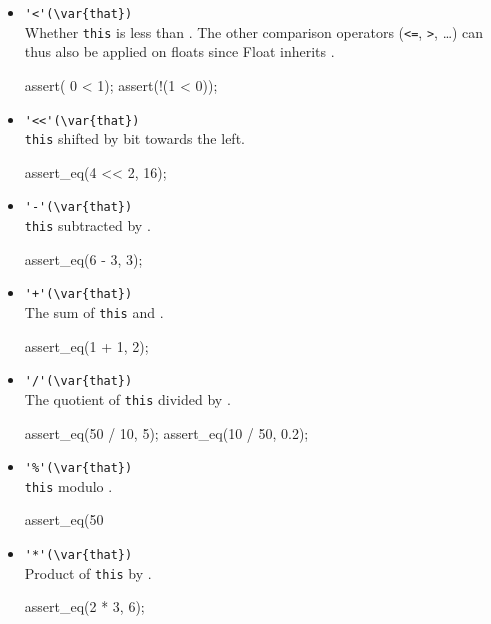 \begin{itemize}
\item \lstinline|'<'(\var{that})|\\
  Whether \lstinline|this| is less than . The other comparison
  operators (\lstinline|<=|, \lstinline|>|, \ldots) can thus also be
  applied on floats since Float inherits .
\begin{urbiscript}[firstnumber=last]
assert(  0 < 1);
assert(!(1 < 0));
\end{urbiscript}

\item \lstinline|'<<'(\var{that})|\\
  \lstinline|this| shifted by  bit towards the left.
\begin{urbiscript}[firstnumber=last]
assert_eq(4 << 2, 16);
\end{urbiscript}

\item \lstinline|'-'(\var{that})|\\
  \lstinline|this| subtracted by .
\begin{urbiscript}[firstnumber=last]
assert_eq(6 - 3, 3);
\end{urbiscript}

\item \lstinline|'+'(\var{that})|\\
  The sum of \lstinline|this| and .
\begin{urbiscript}[firstnumber=last]
assert_eq(1 + 1, 2);
\end{urbiscript}

\item \lstinline|'/'(\var{that})|\\
  The quotient of \lstinline|this| divided by .
\begin{urbiscript}[firstnumber=last]
assert_eq(50 / 10, 5);
assert_eq(10 / 50, 0.2);
\end{urbiscript}

\item \lstinline|'%'(\var{that})|\\
  \lstinline|this| modulo .
\begin{urbiscript}[firstnumber=last]
assert_eq(50 %
\end{urbiscript}

\item \lstinline|'*'(\var{that})|\\
  Product of \lstinline|this| by .
\begin{urbiscript}[firstnumber=last]
assert_eq(2 * 3, 6);
\end{urbiscript}


\end{itemize}
